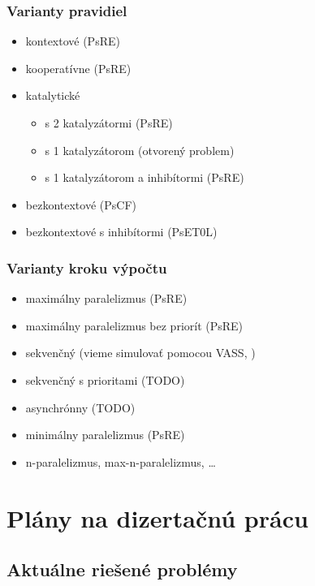 \begin{frame}[t]\frametitle{Varianty pravidiel}
\begin{itemize}
  \item kontextové (PsRE)
  \item kooperatívne (PsRE)
  \item katalytické
  \begin{itemize}
    \item s 2 katalyzátormi (PsRE) \cite{Freund2005TwoCatalysts}
    \item s 1 katalyzátorom (otvorený problem)
    \item s 1 katalyzátorom a inhibítormi (PsRE) \cite{Ionescu:jucs_10_5:on_p_systems_with}
  \end{itemize}
  \item bezkontextové (PsCF) \cite{Sburlan05dragos}
  \item bezkontextové s inhibítormi (PsET0L) \cite{Ionescu:jucs_10_5:on_p_systems_with}
\end{itemize}
\end{frame}
\note{}

\begin{frame}[t]\frametitle{Varianty kroku výpočtu}
\begin{itemize}
  \item maximálny paralelizmus (PsRE)
  \item maximálny paralelizmus bez priorít (PsRE) \cite{Sosik:2002:WithoutPriorities}
  \item sekvenčný (vieme simulovať pomocou VASS, \cite{Dang:2005:Sequential})
  \item sekvenčný s prioritami (TODO)
  \item asynchrónny (TODO)
  \item minimálny paralelizmus (PsRE) \cite{Ciobanu:2007:MinimalParallelism}
  \item n-paralelizmus, max-n-paralelizmus, \dots
\end{itemize}
\end{frame}
\note{}



\section{Plány na dizertačnú prácu} %
\label{sec:plany_na_dizertacnu_pracu}

\subsection{Aktuálne riešené problémy} %
\label{sub:aktualne_riesene_problemy}

